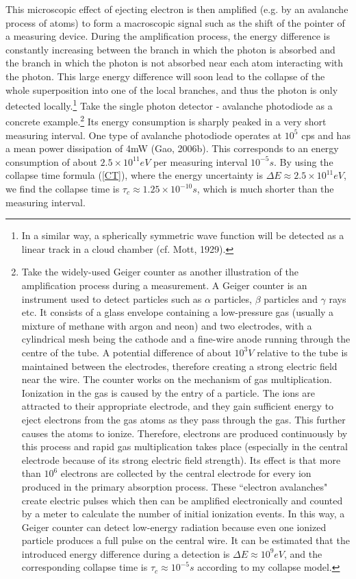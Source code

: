 This microscopic effect of ejecting electron is then amplified (e.g. by an avalanche process of atoms) to form a macroscopic signal such as the shift of the pointer of a measuring device. During the amplification process, the energy difference is constantly increasing between the branch in which the photon is absorbed and the branch in which the photon is not absorbed near each atom interacting with the photon. This large energy difference will soon lead to the collapse of the whole superposition into one of the local branches, and thus the photon is only detected locally.\footnote{In a similar way, a spherically symmetric wave function will be detected as a linear track in a cloud chamber (cf. Mott, 1929).} Take the single photon detector - avalanche photodiode as a concrete example.\footnote{Take the widely-used Geiger counter as another illustration of the amplification process during a measurement. A Geiger counter is an instrument used to detect particles such as $\alpha$ particles, $\beta$ particles and $\gamma$ rays etc. It consists of a glass envelope containing a low-pressure gas (usually a mixture of methane with argon and neon) and two electrodes, with a cylindrical mesh being the cathode and a fine-wire anode running through the centre of the tube. A potential difference of about $10^3V$ relative to the tube is maintained between the electrodes, therefore creating a strong electric field near the wire. The counter works on the mechanism of gas multiplication. Ionization in the gas is caused by the entry of a particle. The ions are attracted to their appropriate electrode, and they gain sufficient energy to eject electrons from the gas atoms as they pass through the gas. This further causes the atoms to ionize. Therefore, electrons are produced continuously by this process and rapid gas multiplication takes place (especially in the central electrode because of its strong electric field strength). Its effect is that more than $10^6$ electrons are collected by the central electrode for every ion produced in the primary absorption process. These ``electron avalanches" create electric pulses which then can be amplified electronically and counted by a meter to calculate the number of initial ionization events. In this way, a Geiger counter can detect low-energy radiation because even one ionized particle produces a full pulse on the central wire. It can be estimated that the introduced energy difference during a detection is $\Delta E \approx 10^{9}eV$, and the corresponding collapse time is $\tau_c \approx 10^{-5}s$ according to my collapse model.} Its energy consumption is sharply peaked in a very short measuring interval. One type of avalanche photodiode operates at $10^5$ cps and has a mean power dissipation of 4mW (Gao, 2006b). This corresponds to an energy consumption of about $2.5\times 10^{11}eV$ per measuring interval $10^{-5}s$. By using the collapse time formula (\ref{CT}), where the energy uncertainty is $\Delta E \approx 2.5\times 10^{11}eV$, we find the collapse time is  $\tau_c \approx 1.25\times 10^{-10}s$, which is much shorter than the measuring interval.


